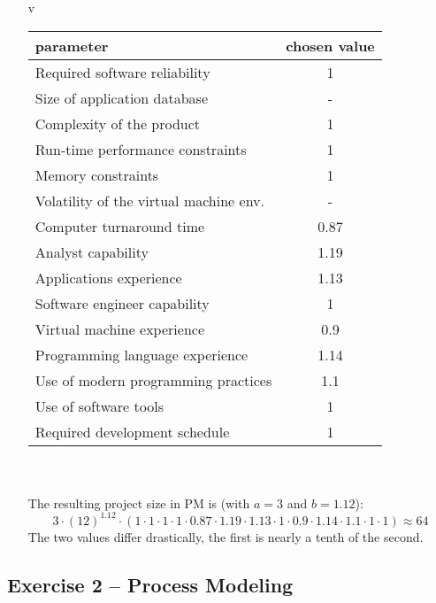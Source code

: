\documentclass{scrartcl}
\begin{document}
\begin{itemize}
	\item[v]

	\begin{tabular}{l | c}
		parameter & chosen value \\
		\hline
		Required software reliability & 1\\
		Size of application database & -\\
		Complexity of the product & 1\\
		Run-time performance constraints  & 1\\
		Memory constraints & 1\\
		Volatility of the virtual machine env. & -\\
		Computer turnaround time & 0.87\\
		Analyst capability & 1.19\\
		Applications experience & 1.13\\
		Software engineer capability & 1\\
		Virtual machine experience & 0.9\\
		Programming language experience & 1.14\\
		Use of modern programming practices & 1.1\\
		Use of software tools & 1\\
		Required development schedule & 1\\
	\end{tabular}\\\\
	The resulting project size in PM is (with $a=3$ and $b=1.12$):
	\[3 \cdot (12)^{1.12}\cdot (1\cdot 1 \cdot 1 \cdot 1 \cdot 0.87 \cdot 1.19 \cdot 1.13 \cdot 1 \cdot 0.9 \cdot 1.14 \cdot 1.1 \cdot 1 \cdot 1) \approx 64\]
	The two values differ drastically, the first is nearly a tenth of the second. 
\end{itemize}

\subsection*{Exercise 2 – Process Modeling}
\end{document}
